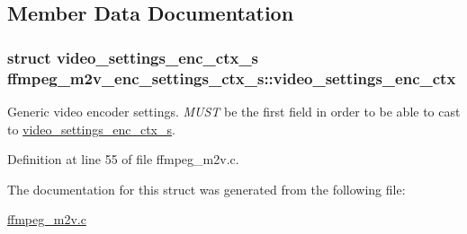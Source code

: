 \subsection{Member Data Documentation}
\subsubsection[{\texorpdfstring{video\+\_\+settings\+\_\+enc\+\_\+ctx}{video_settings_enc_ctx}}]{\setlength{\rightskip}{0pt plus 5cm}struct {\bf video\+\_\+settings\+\_\+enc\+\_\+ctx\+\_\+s} ffmpeg\+\_\+m2v\+\_\+enc\+\_\+settings\+\_\+ctx\+\_\+s\+::video\+\_\+settings\+\_\+enc\+\_\+ctx}\hypertarget{structffmpeg__m2v__enc__settings__ctx__s_a15787044210ce107442c4e08a3f884b8}{}\label{structffmpeg__m2v__enc__settings__ctx__s_a15787044210ce107442c4e08a3f884b8}
Generic video encoder settings. {\itshape M\+U\+ST} be the first field in order to be able to cast to \hyperlink{structvideo__settings__enc__ctx__s}{video\+\_\+settings\+\_\+enc\+\_\+ctx\+\_\+s}. 

Definition at line 55 of file ffmpeg\+\_\+m2v.\+c.



The documentation for this struct was generated from the following file\+:\begin{DoxyCompactItemize}
\item 
\hyperlink{ffmpeg__m2v_8c}{ffmpeg\+\_\+m2v.\+c}\end{DoxyCompactItemize}
